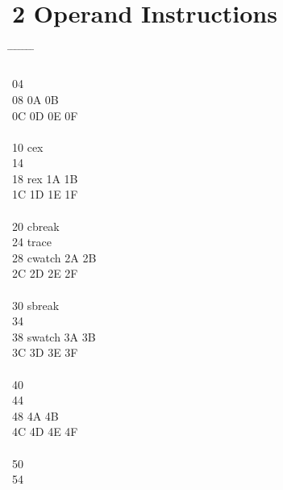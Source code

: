 \documentclass[letterpaper,10pt,openright,twoside,onecolumn]{book}
\begin{document}
\newpage\section{2 Operand Instructions}
  \begin{tabbing}
    \makebox[\ncol]{00\hfill} \= \makebox[\icol]{\hfill}	\=
    \makebox[\ncol]{01\hfill} \= \makebox[\icol]{\hfill}	\=
    \makebox[\ncol]{02\hfill} \= \makebox[\icol]{\hfill}	\=
    \makebox[\ncol]{03\hfill} \= 	\\
    \\
    04 \> 	 \> 	 \> 	 \> 	\\
    08 \> 	 \> 	\> 0A \> 	\> 0B \> 	\\
    0C \> 	\> 0D \> 	\> 0E \> 	\> 0F \> 	\\
    \\
    10 \> cex 	 \> 	 \> 	 \> 	\\
    14 \> 	 \> 	 \> 	 \> 	\\
    18 \> rex	 \> 	\> 1A \> 	\> 1B \> 	\\
    1C \> 	\> 1D \> 	\> 1E \> 	\> 1F \> 	\\
    \\
    20 \>cbreak	 \> 	 \> 	 \> 	\\
    24 \> trace	 \> 	 \> 	 \> 	\\
    28 \>cwatch	 \> 	\> 2A \> 	\> 2B \> 	\\
    2C \>	\> 2D \> 	\> 2E \> 	\> 2F \> 	\\
    \\
    30 \>sbreak	 \> 	 \> 	 \> 	\\
    34 \> 	 \> 	 \> 	 \> 	\\
    38 \>swatch	 \> 	\> 3A \> 	\> 3B \> 	\\
    3C \> 	\> 3D \> 	\> 3E \> 	\> 3F \> 	\\
    \\
    40 \> 	 \> 	 \> 	 \> 	\\
    44 \> 	 \> 	 \> 	 \> 	\\
    48 \> 	 \> 	\> 4A \> 	\> 4B \> 	\\
    4C \> 	\> 4D \> 	\> 4E \> 	\> 4F \> 	\\
    \\
    50 \> 	 \> 	 \> 	 \> 	\\
    54 \> 	 \> 	 \> 	 \> 	\\

\end{tabbing}
\end{document}
